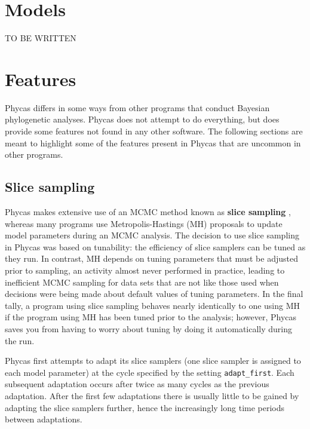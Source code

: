 \documentclass[10pt]{article}
\newcommand{\opt}[1]{{\tt \small #1}\index{#1}}		%
\newcommand{\term}[1]{{\bfseries #1}\index{#1}}		%
\begin{document}
\section{Models}\label{sec:models}

TO BE WRITTEN

\section{Features}\label{sec:features}

Phycas differs in some ways from other programs that conduct Bayesian phylogenetic analyses. Phycas does not attempt to do everything, but does provide some features not found in any other software. The following sections are meant to highlight some of the features present in Phycas that are uncommon in other programs.

\subsection{Slice sampling}

Phycas makes extensive use of an MCMC method known as \term{slice sampling} \citep{Neal2003a}, whereas many programs use Metropolis-Hastings (MH) proposals to update model parameters during an MCMC analysis. The decision to use slice sampling in Phycas was based on tunability: the efficiency of slice samplers can be tuned as they run. In contrast, MH depends on tuning parameters that must be adjusted prior to sampling, an activity almost never performed in practice, leading to inefficient MCMC sampling for data sets that are not like those used when decisions were being made about default values of tuning parameters. In the final tally, a program using slice sampling behaves nearly identically to one using MH if the program using MH has been tuned prior to the analysis; however, Phycas saves you from having to worry about tuning by doing it automatically during the run. 

Phycas first attempts to adapt its slice samplers (one slice sampler is assigned to each model parameter) at the cycle specified by the setting \opt{adapt\_first}. Each subsequent adaptation occurs after twice as many cycles as the previous adaptation. After the first few adaptations there is usually little to be gained by adapting the slice samplers further, hence the increasingly long time periods between adaptations. 
\end{document}
